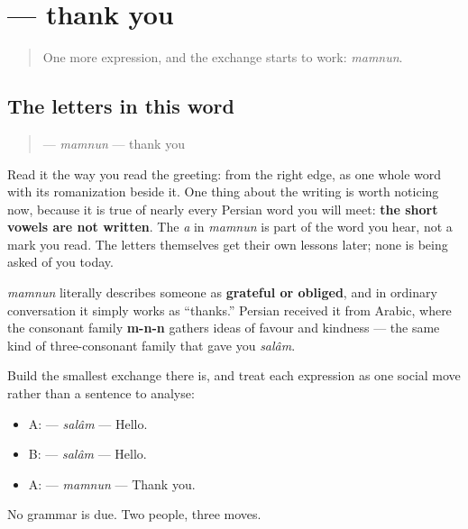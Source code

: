 \section[\texorpdfstring{\fa{ممنون} (mamnun)}{ممنون (mamnun)}]{ — thank you}

\label{lesson:FA-C01-mamnoon}



\begin{quote}
One more expression, and the exchange starts to work: \emph{mamnun}.
\end{quote}

\subsection*{The letters in this word}
\begin{quote}
\textbf{} — \emph{mamnun} — thank you
\end{quote}

Read it the way you read the greeting: from the right edge, as one whole word with its romanization beside it. One thing about the writing is worth noticing now, because it is true of nearly every Persian word you will meet: \textbf{the short vowels are not written}. The \emph{a} in \emph{mamnun} is part of the word you hear, not a mark you read. The letters themselves get their own lessons later; none is being asked of you today.

\begin{cousinweb}
\emph{mamnun} literally describes someone as \textbf{grateful or obliged}, and in ordinary conversation it simply works as “thanks.” Persian received it from Arabic, where the consonant family \textbf{m-n-n} gathers ideas of favour and kindness — the same kind of three-consonant family that gave you \emph{salâm}.
\end{cousinweb}

\begin{culture}
Build the smallest exchange there is, and treat each expression as one social move rather than a sentence to analyse:

\begin{itemize}
\raggedright
  \item A: \textbf{} — \emph{salâm} — Hello.
  \item B: \textbf{} — \emph{salâm} — Hello.
  \item A: \textbf{} — \emph{mamnun} — Thank you.
\end{itemize}

No grammar is due. Two people, three moves.
\end{culture}

